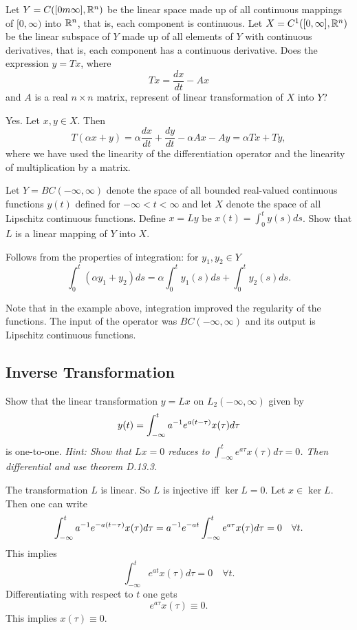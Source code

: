 \begin{problem}
	Let $ Y = C([0m\infty],\mathbb{R}^n) $ be the linear space made up of all continuous mappings of $ [0,\infty) $ into $ \mathbb{R}^n $, that is, each component is continuous. Let $ X = C^1([0,\infty],\mathbb{R}^n) $ be the linear subspace of $ Y $ made up of all elements of $ Y $ with continuous derivatives, that is, each component has a continuous derivative. Does the expression $ y = Tx $, where
	\[ Tx = \frac{dx}{dt} - Ax \]
	and $ A $ is a real $ n\times n $ matrix, represent of linear transformation of $ X $ into $ Y $?
\end{problem}

\begin{solution}
	Yes. Let $ x,y\in X $. Then
	\[ T(\alpha x + y) = \alpha \frac{dx}{dt} + \frac{dy}{dt} - \alpha Ax - Ay=  \alpha Tx + Ty, \]
	where we have used the linearity of the differentiation operator and the linearity of multiplication by a matrix.
\end{solution}

\begin{problem}
	Let $ Y = BC(-\infty,\infty) $ denote the space of all bounded real-valued continuous functions $ y(t) $ defined for $ -\infty < t < \infty $ and let $ X $ denote the space of all Lipschitz continuous functions. Define $ x = Ly $ be $ x(t) = \int_{0}^{t}y(s)ds $. Show that $ L $ is a linear mapping of $ Y $ into $ X $.
\end{problem}
\begin{solution}
	Follows from the properties of integration: for $ y_1,y_2 \in Y $
	\[ \int_{0}^{t}(\alpha y_1+y_2)ds = \alpha \int_{0}^{t}y_1(s)ds + \int_{0}^{t}y_2(s)ds. \]
\end{solution}

\begin{remark}
	Note that in the example above, integration improved the regularity of the functions. The input of the operator was $ BC(-\infty,\infty) $ and its output is Lipschitz continuous functions.
\end{remark}



\subsection{Inverse Transformation}
\begin{problem}
	Show that the linear transformation $ y = Lx $ on $ L_2(-\infty,\infty) $ given by
	\[ y(t) = \int_{-\infty}^{t}a^{-1}e^{a(t-\tau)}x(\tau) d\tau \]
	is one-to-one. \emph{Hint: Show that $ Lx = 0 $ reduces to $ \int_{-\infty}^{t} e^{a\tau}x(\tau)d\tau = 0$. Then differential and use theorem D.13.3.}
\end{problem}
\begin{solution}
	The transformation $ L $ is linear. So $ L $ is injective iff $ \ker L = 0 $. Let $ x\in \ker L $. Then one can write
	\[ \int_{-\infty}^{t}a^{-1}e^{-a(t-\tau)}x(\tau) d\tau = a^{-1} e^{-at} \int_{-\infty}^{t}e^{a\tau}x(\tau) d\tau = 0 \quad \forall t. \]
	This implies
	\[ \int_{-\infty}^{t} e^{at}x(\tau)d\tau = 0 \quad \forall t. \]
	Differentiating with respect to $ t $ one gets
	\[ e^{a\tau}x(\tau) \equiv 0. \]
	This implies $ x(\tau) \equiv 0 $.
\end{solution}


